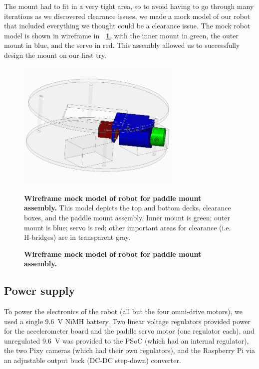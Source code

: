 \documentclass[letterpaper, 11pt]{article}
\newcommand*{\figref}[1]{\textbf{\figurename~\ref{#1}}}
\begin{document}
The mount had to fit in a very tight area, so to avoid having to go through many iterations as we discovered clearance issues, we made a mock model of our robot that included everything we thought could be a clearance issue. The mock robot model is shown in wireframe in \figref{fig:mock}, with the inner mount in green, the outer mount in blue, and the servo in red. This assembly allowed us to successfully design the mount on our first try.

\begin{figure}[ht]
    \centering
    \includegraphics[width=0.7\textwidth]{images/test-assembly.png}
    \caption{\textbf{Wireframe mock model of robot for paddle mount assembly.} This model depicts the top and bottom decks, clearance boxes, and the paddle mount assembly. Inner mount is green; outer mount is blue; servo is red; other important areas for clearance (i.e. H-bridges) are in transparent gray.}
    \caption{\textbf{Wireframe mock model of robot for paddle mount assembly.}}
    \label{fig:mock}
\end{figure}

\subsection{Power supply}
\label{sec:power}
To power the electronics of the robot (all but the four omni-drive motors), we used a single \SI{9.6}{V} NiMH battery. Two linear voltage regulators provided power for the accelerometer board and the paddle servo motor (one regulator each), and unregulated \SI{9.6}{V} was provided to the PSoC (which had an internal regulator), the two Pixy cameras (which had their own regulators), and the Raspberry Pi via an adjustable output buck (DC-DC step-down) converter.
\end{document}

